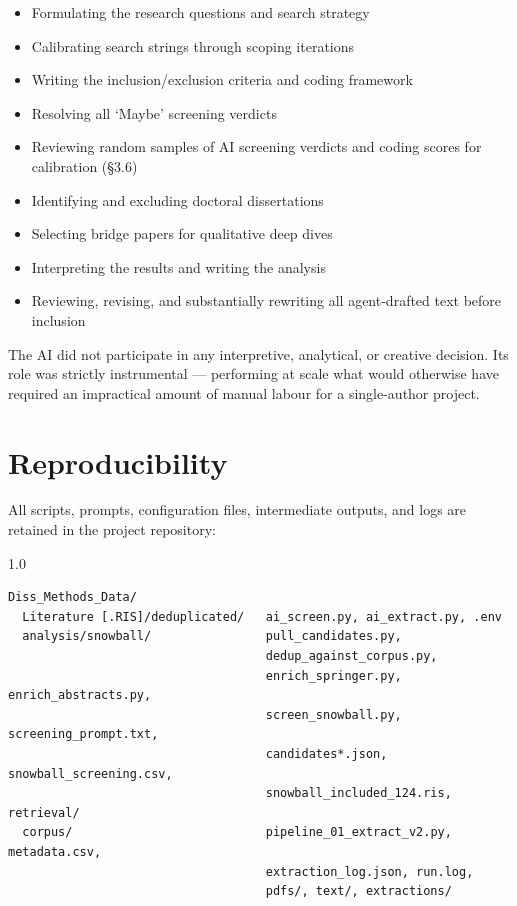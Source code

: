 \begin{itemize}
  \item Formulating the research questions and search strategy
  \item Calibrating search strings through scoping iterations
  \item Writing the inclusion/exclusion criteria and coding framework
  \item Resolving all `Maybe' screening verdicts
  \item Reviewing random samples of AI screening verdicts and coding scores for calibration (\S 3.6)
  \item Identifying and excluding doctoral dissertations
  \item Selecting bridge papers for qualitative deep dives
  \item Interpreting the results and writing the analysis
  \item Reviewing, revising, and substantially rewriting all agent-drafted text before inclusion
\end{itemize}

The AI did not participate in any interpretive, analytical, or creative decision. Its role was strictly instrumental --- performing at scale what would otherwise have required an impractical amount of manual labour for a single-author project.

\section{Reproducibility}

All scripts, prompts, configuration files, intermediate outputs, and logs are retained in the project repository:

\begin{spacing}{1.0}
\footnotesize
\begin{verbatim}
Diss_Methods_Data/
  Literature [.RIS]/deduplicated/   ai_screen.py, ai_extract.py, .env
  analysis/snowball/                pull_candidates.py,
                                    dedup_against_corpus.py,
                                    enrich_springer.py, enrich_abstracts.py,
                                    screen_snowball.py, screening_prompt.txt,
                                    candidates*.json, snowball_screening.csv,
                                    snowball_included_124.ris, retrieval/
  corpus/                           pipeline_01_extract_v2.py, metadata.csv,
                                    extraction_log.json, run.log,
                                    pdfs/, text/, extractions/
\end{verbatim}
\end{spacing}

